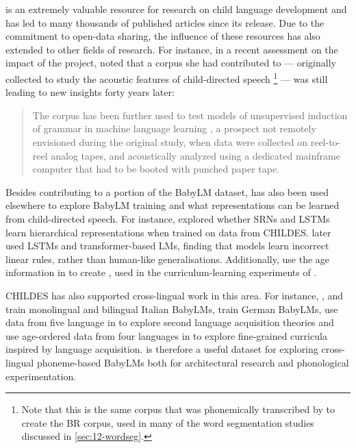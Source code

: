 \childes is an extremely valuable resource for research on child language development and has led to many thousands of published articles since its release. Due to the commitment to open-data sharing, the influence of these resources has also extended to other fields of research. For instance, in a recent assessment on the impact of the  project, \citet{bernstein_ratner_augmenting_2024} noted that a corpus she had contributed to \childes --- originally collected to study the acoustic features of child-directed speech \citep{Ratner_1984}\footnote{Note that this is the same corpus that was phonemically transcribed by \citet{Brent1999} to create the BR corpus, used in many of the word segmentation studies discussed in \cref{sec:12-wordseg}.} --- was still leading to new insights forty years later:
\begin{quote}
The corpus has been further used to test models of unsupervised induction of grammar in machine language learning \citep{glushchenko_programmatic_2019}, a prospect not remotely envisioned during the original study, when data were collected on reel-to-reel analog tapes, and acoustically analyzed using a dedicated mainframe computer that had to be booted with punched paper tape.
\end{quote}

Besides contributing to a portion of the BabyLM dataset, \childes has also been used elsewhere to explore BabyLM training and what representations can be learned from child-directed speech. For instance, \citet{huebner_structured_2018} explored whether SRNs and LSTMs learn hierarchical representations when trained on data from CHILDES. \citet{yedetore-etal-2023-poor} later used LSTMs and transformer-based LMs, finding that models learn incorrect linear rules, rather than human-like generalisations. Additionally, \citet{huebner2021using} use the age information in \childes to create , used in the curriculum-learning experiments of \citet{huebner-etal-2021-babyberta}.

CHILDES has also supported cross-lingual work in this area. For instance, \citet{capone2024babies}, \citet{shen2024bambino} and \citet{suozzi2025bambidevelopingbabylanguage} train monolingual and bilingual Italian BabyLMs, \citet{bunzeck2025constructiondistributionsshapeformal} train German BabyLMs, \citet{yadavalli2023slabert} use data from five language in \childes to explore second language acquisition theories and \citet{salhan-etal-2024-less} use age-ordered data from four languages in \childes to explore fine-grained curricula inspired by language acquisition. \childes is therefore a useful dataset for exploring cross-lingual phoneme-based BabyLMs both for architectural research and phonological experimentation.  

